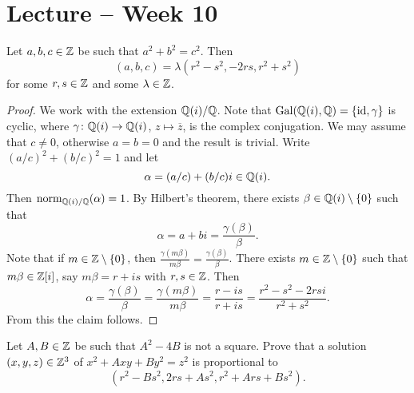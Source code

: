 \section{Lecture -- Week 10}


\begin{corollary}
    Let $a,b,c\in \mathbb{Z}$ be such that $a^2+b^2=c^2$. Then 
    \[
    (a,b,c)=\lambda(r^2-s^2,-2rs, r^2+s^2)
    \]
    for some $r,s\in\mathbb{Z}$ and some $\lambda\in\mathbb{Z}$.
\end{corollary}

\begin{proof}
    We work with the extension $\mathbb{Q}(i)/\mathbb{Q}$. Note that 
    $\operatorname{Gal}(\mathbb{Q}(i),\mathbb{Q})=\{\operatorname{id},\gamma\}$ is cyclic, where 
    $\gamma\colon\mathbb{Q}(i)\to\mathbb{Q}(i)$, $z\mapsto\overline{z}$, is the complex conjugation. 
    We may assume that $c\ne 0$, otherwise $a=b=0$ and the result is trivial.  
    Write $(a/c)^2+(b/c)^2=1$ and let 
    \[
    \alpha=(a/c)+(b/c)i\in\mathbb{Q}(i).
    \]
    Then
    $\operatorname{norm}_{\mathbb{Q}(i)/\mathbb{Q}}(\alpha)=1$. 
    By Hilbert's theorem, 
    there exists $\beta\in\mathbb{Q}(i)\setminus\{0\}$ such that 
    \[
    \alpha=a+bi=\frac{\gamma(\beta)}{\beta}.
    \]
    Note that if $m\in\mathbb{Z}\setminus\{0\}$, then 
    $\frac{\gamma(m\beta)}{m\beta}=\frac{\gamma(\beta)}{\beta}$. 
    There exists $m\in\mathbb{Z}\setminus\{0\}$ such that 
    $m\beta\in\mathbb{Z}[i]$, say $m\beta=r+is$ with $r,s\in\mathbb{Z}$. Then
    \[
    \alpha=\frac{\gamma(\beta)}{\beta}=\frac{\gamma(m\beta)}{m\beta}=
    \frac{r-is}{r+is}=\frac{r^2-s^2-2rsi}{r^2+s^2}.
    \]
    From this the claim follows. 
\end{proof}

\begin{exercise}
Let $A,B\in\mathbb{Z}$ be such that $A^2-4B$ is not a square. Prove that 
a solution $(x,y,z)\in\mathbb{Z}^3$ of $x^2 + Axy + By^2 = z^2$
is proportional to 
\[
(r^2-Bs^2,2rs+As^2,r^2+Ars+Bs^2).
\]
\end{exercise}


%    
%


